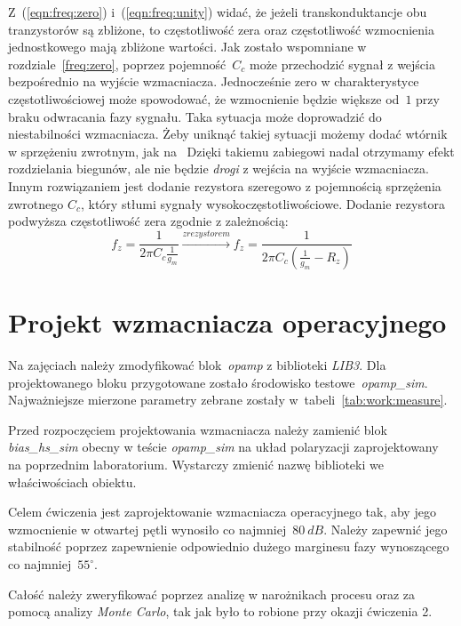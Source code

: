 \documentclass[twoside,pl,final]{labman}
\begin{document}
Z~(\ref{eqn:freq:zero}) i~(\ref{eqn:freq:unity}) widać,
że jeżeli transkonduktancje obu tranzystorów są zbliżone, to
częstotliwość zera oraz częstotliwość wzmocnienia jednostkowego
mają zbliżone wartości.
Jak zostało wspomniane w rozdziale~\ref{freq:zero},
poprzez pojemność~$C_c$ może przechodzić sygnał z wejścia
bezpośrednio na wyjście wzmacniacza.
Jednocześnie zero w charakterystyce częstotliwościowej może spowodować,
że wzmocnienie będzie większe od~$1$ przy braku odwracania fazy sygnału.
Taka sytuacja może doprowadzić do niestabilności wzmacniacza.
Żeby uniknąć takiej sytuacji możemy dodać wtórnik w sprzężeniu zwrotnym,
jak na~
Dzięki takiemu zabiegowi nadal otrzymamy efekt rozdzielania biegunów,
ale nie będzie \emph{drogi} z wejścia na wyjście wzmacniacza.
Innym rozwiązaniem jest dodanie rezystora szeregowo z pojemnością sprzężenia
zwrotnego $C_c$, który stłumi sygnały wysokoczęstotliwościowe.
Dodanie rezystora podwyższa częstotliwość zera zgodnie z zależnością:
\begin{equation}
  f_z = \frac{1}{2 \pi C_c \frac{1}{g_m}} \xrightarrow{z rezystorem}
  f_z = \frac{1}{2 \pi C_c (\frac{1}{g_m} - R_z)}
\end{equation}

\chapter{Projekt wzmacniacza operacyjnego}
\label{work}
Na zajęciach należy zmodyfikować blok~\emph{opamp}
z biblioteki \emph{LIB3}.
Dla projektowanego bloku przygotowane zostało
środowisko testowe~\emph{opamp\_sim}.
Najważniejsze mierzone parametry zebrane
zostały w~tabeli~\ref{tab:work:measure}.

Przed rozpoczęciem projektowania wzmacniacza należy zamienić blok
\emph{bias\_hs\_sim} obecny w teście \emph{opamp\_sim}
na układ polaryzacji zaprojektowany na poprzednim laboratorium.
Wystarczy zmienić nazwę biblioteki we właściwościach obiektu.

Celem ćwiczenia jest zaprojektowanie wzmacniacza operacyjnego tak,
aby jego wzmocnienie w otwartej pętli wynosiło co najmniej~$80~dB$.
Należy zapewnić jego stabilność poprzez zapewnienie odpowiednio
dużego marginesu fazy wynoszącego co najmniej~$55^\circ$.

Całość należy zweryfikować poprzez analizę w narożnikach procesu
oraz za pomocą analizy \emph{Monte Carlo},
tak jak było to robione przy okazji ćwiczenia 2.
\end{document}
